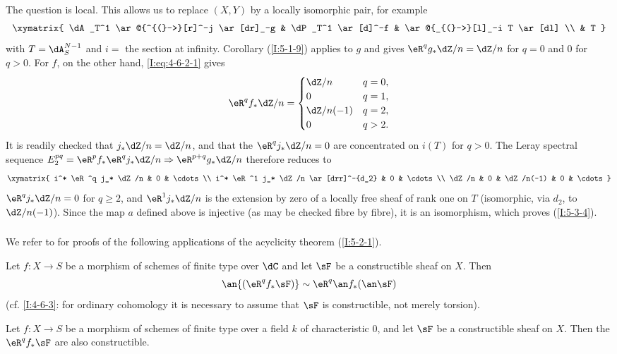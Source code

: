 \documentclass[oneside]{book}
\begin{document}
The question is local. This allows us to replace $(X,Y)$ by a locally
isomorphic pair, for example
\[\xymatrix{
  \dA_T^1 \ar@{^{(}->}[r]^-j \ar[dr]_-g
    & \dP_T^1 \ar[d]^-f
    & \ar@{_{(}->}[l]_-i T \ar[dl] \\
  & T
}\]
with $T=\dA_S^{N-1}$ and $i=$ the section at infinity. Corollary
(\ref{I:5-1-9}) applies to $g$ and gives
$\eR^qg_*\dZ/n=\dZ/n$ for $q=0$ and $0$ for $q>0$. For $f$, on the
other hand, \eqref{I:eq:4-6-2-1} gives
\[
  \eR^q f_* \dZ/n =
  \begin{cases}
    \dZ/n & q=0,\\
    0 & q=1,\\
    \dZ/n(-1) & q=2,\\
    0 & q>2.
  \end{cases}
\]
It is readily checked that $j_*\dZ/n=\dZ/n$, and that the
$\eR^qj_*\dZ/n=0$ are concentrated on $i(T)$ for $q>0$. The Leray
spectral sequence
$E_2^{pq}=\eR^pf_*\eR^qj_*\dZ/n\Rightarrow\eR^{p+q}g_*\dZ/n$ therefore
reduces to
\[\xymatrix{
  i^* \eR^q j_* \dZ/n & 0 & \cdots \\
  i^* \eR^1 j_* \dZ/n \ar[drr]^-{d_2} & 0 & \cdots \\
  \dZ/n              & 0 & \dZ/n(-1) & 0 & \cdots
}\]
$\eR^qj_*\dZ/n=0$ for $q\geqslant2$, and $\eR^1j_*\dZ/n$ is the
extension by zero of a locally free sheaf of rank one on $T$ (isomorphic,
via $d_2$, to $\dZ/n(-1)$). Since the map $a$ defined above is injective
(as may be checked fibre by fibre), it is an isomorphism, which proves
(\ref{I:5-3-4}).

\subsubsection{}\label{I:5-3-5}

We refer to \cite[XVI.4,5]{sga4} for proofs of the following applications
of the acyclicity theorem (\ref{I:5-2-1}).

\begin{theorem}\label{I:5-3-6} %
Let $f:X\to S$ be a morphism of schemes of finite type over $\dC$ and
let $\sF$ be a constructible sheaf on $X$. Then
\[
  \an{(\eR^q f_*\sF)} \sim \eR^q \an f_* (\an\sF)
\]
(cf. \ref{I:4-6-3}: for ordinary cohomology it is necessary to assume
that $\sF$ is constructible, not merely torsion).
\end{theorem}

\begin{theorem}\label{I:5-3-7} %
Let $f:X\to S$ be a morphism of schemes of finite type over a field $k$
of characteristic $0$, and let $\sF$ be a constructible sheaf on $X$.
Then the $\eR^qf_*\sF$ are also constructible.
\end{theorem}
\end{document}
